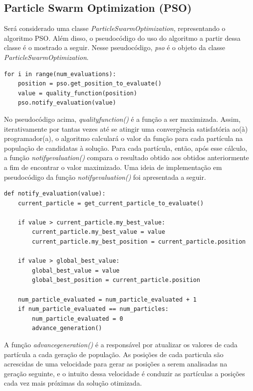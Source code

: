 \documentclass[conference]{IEEEtran}
\begin{document}
\subsection{Particle Swarm Optimization (PSO)}
Será considerado uma classe \textit{ParticleSwarmOptimization}, representando o algoritmo PSO. Além disso, o pseudocódigo do uso do algoritmo a partir dessa classe é o mostrado a seguir. Nesse pseudocódigo, \textit{pso} é o objeto da classe \textit{ParticleSwarmOptimization}.

\begin{lstlisting}
for i in range(num_evaluations):
	position = pso.get_position_to_evaluate()
	value = quality_function(position)
	pso.notify_evaluation(value)
\end{lstlisting}

No pseudocódigo acima, \textit{quality\underline{\space}function()} é a função a ser maximizada. Assim, iterativamente por tantas vezes até se atingir uma convergência satisfatória ao(à) programador(a), o algoritmo calculará o valor da função para cada partícula na população de candidatas à solução. Para cada partícula, então, após esse cálculo, a função \textit{notify\underline{\space}evaluation()} compara o resultado obtido aos obtidos anteriormente a fim de encontrar o valor maximizado. Uma ideia de implementação em pseudocódigo da função \textit{notify\underline{\space}evaluation()} foi apresentada a seguir.

\begin{lstlisting}
def notify_evaluation(value):
	current_particle = get_current_particle_to_evaluate()

	if value > current_particle.my_best_value:
		current_particle.my_best_value = value
		current_particle.my_best_position = current_particle.position

	if value > global_best_value:
		global_best_value = value
		global_best_position = current_particle.position

	num_particle_evaluated = num_particle_evaluated + 1
	if num_particle_evaluated == num_particles:
		num_particle_evaluated = 0
		advance_generation()
\end{lstlisting}

A função \textit{advance\underline{\space}generation()} é a responsável por atualizar os valores de cada partícula a cada geração de população. As posições de cada particula são acrescidas de uma velocidade para gerar as posições a serem analisadas na geração seguinte, e o intuito dessa velocidade é conduzir as partículas a posições cada vez mais próximas da solução otimizada.
\end{document}
